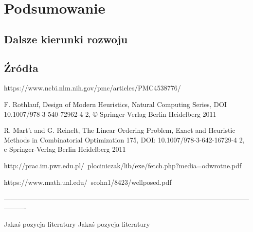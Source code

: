 \documentclass[twoside]{projektInzynierskiMS1}
\begin{document}
\section{Podsumowanie}
	\subsection{Dalsze kierunki rozwoju}
	\subsection{Źródła}
https://www.ncbi.nlm.nih.gov/pmc/articles/PMC4538776/

F. Rothlauf, Design of Modern Heuristics, Natural Computing Series,
DOI 10.1007/978-3-540-72962-4 2, © Springer-Verlag Berlin Heidelberg 2011

R. Mart'ı and G. Reinelt, The Linear Ordering Problem, Exact and Heuristic Methods
in Combinatorial Optimization 175, DOI: 10.1007/978-3-642-16729-4 2,
c Springer-Verlag Berlin Heidelberg 2011

http://prac.im.pwr.edu.pl/~plociniczak/lib/exe/fetch.php?media=odwrotne.pdf

https://www.math.unl.edu/~scohn1/8423/wellposed.pdf

%


----------------------------------------------------------------------------------------------------------------------

\begin{thebibliography}{12}

 Jakaś pozycja literatury
 Jakaś pozycja literatury

\end{thebibliography}
\end{document}
